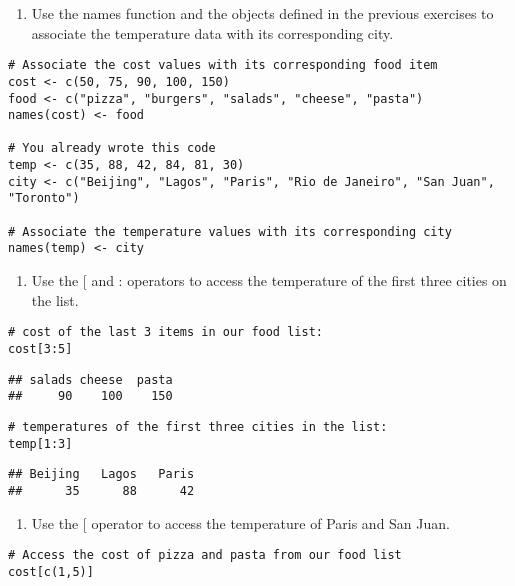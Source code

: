 \documentclass[
]{article}
\providecommand{\tightlist}{%
  \setlength{\itemsep}{0pt}\setlength{\parskip}{0pt}}
\begin{document}
\begin{enumerate}
\def\labelenumi{\arabic{enumi}.}
\setcounter{enumi}{2}
\tightlist
\item
  Use the names function and the objects defined in the previous
  exercises to associate the temperature data with its corresponding
  city.
\end{enumerate}

\begin{verbatim}
# Associate the cost values with its corresponding food item
cost <- c(50, 75, 90, 100, 150)
food <- c("pizza", "burgers", "salads", "cheese", "pasta")
names(cost) <- food

# You already wrote this code
temp <- c(35, 88, 42, 84, 81, 30)
city <- c("Beijing", "Lagos", "Paris", "Rio de Janeiro", "San Juan", "Toronto")

# Associate the temperature values with its corresponding city
names(temp) <- city
\end{verbatim}

\begin{enumerate}
\def\labelenumi{\arabic{enumi}.}
\setcounter{enumi}{3}
\tightlist
\item
  Use the {[} and : operators to access the temperature of the first
  three cities on the list.
\end{enumerate}

\begin{verbatim}
# cost of the last 3 items in our food list:
cost[3:5]
\end{verbatim}

\begin{verbatim}
## salads cheese  pasta 
##     90    100    150
\end{verbatim}

\begin{verbatim}
# temperatures of the first three cities in the list:
temp[1:3]
\end{verbatim}

\begin{verbatim}
## Beijing   Lagos   Paris 
##      35      88      42
\end{verbatim}

\begin{enumerate}
\def\labelenumi{\arabic{enumi}.}
\setcounter{enumi}{4}
\tightlist
\item
  Use the {[} operator to access the temperature of Paris and San Juan.
\end{enumerate}

\begin{verbatim}
# Access the cost of pizza and pasta from our food list 
cost[c(1,5)]
\end{verbatim}
\end{document}
